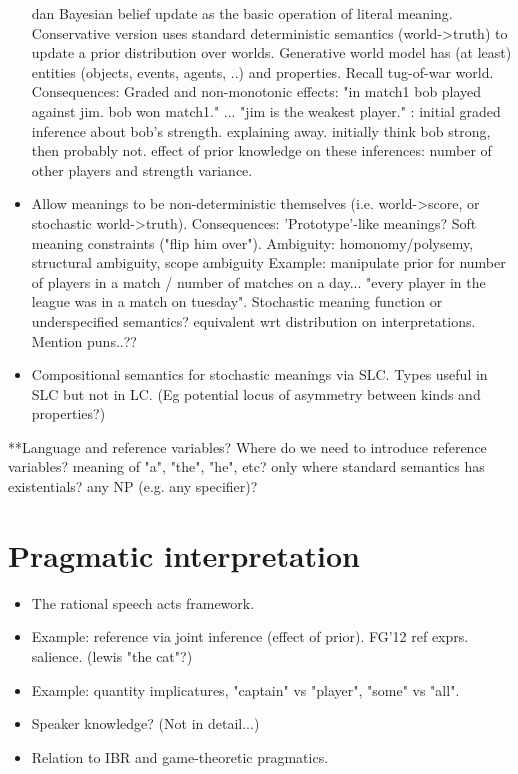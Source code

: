 \documentclass[12pt]{article}
\begin{document}
\begin{itemize}  
\item [dan] Bayesian belief update as the basic operation of literal meaning.
\subitem     Conservative version uses standard deterministic semantics (world->truth) to update a prior distribution over worlds.
\subitem     Generative world model has (at least) entities (objects, events, agents, ..) and properties. Recall tug-of-war world.
\subitem[(ndg)]     Consequences:  Graded and non-monotonic effects: 
"in match1 bob played against jim. bob won match1." ... "jim is the weakest player." : initial graded inference about bob's strength. explaining away. initially think bob strong, then probably not. effect of prior knowledge on these inferences: number of other players and strength variance.


\item  Allow meanings to be non-deterministic themselves (i.e. world->score, or stochastic world->truth).
\subitem     Consequences: 'Prototype'-like meanings? Soft meaning constraints ("flip him over").
\subitem     Ambiguity:  homonomy/polysemy, structural ambiguity, scope ambiguity 
\subitem     Example: manipulate prior for number of players in a match / number of matches on a day... "every player in the league was in a match on tuesday".
\subitem     Stochastic meaning function or underspecified semantics? equivalent wrt distribution on interpretations.
\subitem     Mention puns..??
        
\item  Compositional semantics for stochastic meanings via SLC.
\subitem     Types useful in SLC but not in LC. (Eg potential locus of asymmetry between kinds and properties?)

\end{itemize}

 **Language and reference variables? Where do we need to introduce reference variables? meaning of "a", "the", "he", etc? only where standard semantics has existentials? any NP (e.g. any specifier)? 


\section{Pragmatic interpretation}

\begin{itemize}
\item   The rational speech acts framework.
\item  Example: reference via joint inference (effect of prior). FG'12 ref exprs. salience. (lewis "the cat"?)
\item  Example: quantity implicatures, "captain" vs "player", "some" vs "all".
\item  Speaker knowledge? (Not in detail...)
\item  Relation to IBR and game-theoretic pragmatics.
\end{itemize}
\end{document}
